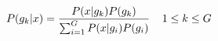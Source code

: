 \begin{equation}
\large 
P(g_{k}|x) = \frac{P(x|g_{k}) P(g_{k})} {\sum_{i=1}^{G}P(x|g_{i}) P(g_{i})} \:\:\:\:\: 1\leq k \leq G
\label{eq:grt:gauss}
\end{equation}